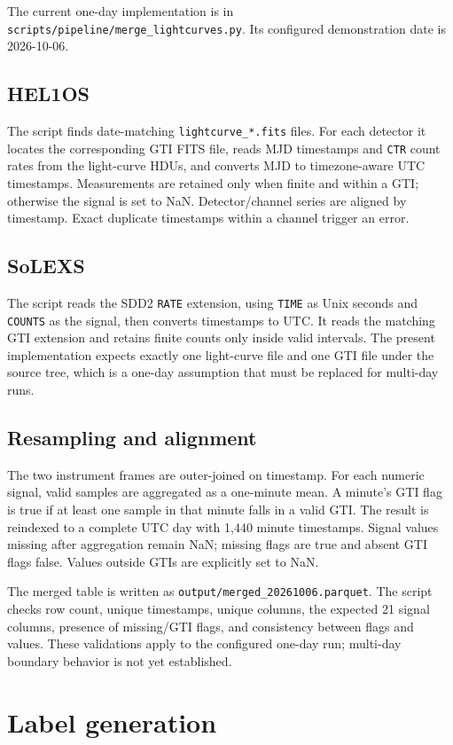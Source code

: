 \documentclass[11pt,a4paper]{article}
\begin{document}
The current one-day implementation is in \texttt{scripts/pipeline/merge\_lightcurves.py}. Its configured demonstration date is 2026-10-06.

\subsection{HEL1OS}
The script finds date-matching \texttt{lightcurve\_*.fits} files. For each detector it locates the corresponding GTI FITS file, reads MJD timestamps and \texttt{CTR} count rates from the light-curve HDUs, and converts MJD to timezone-aware UTC timestamps. Measurements are retained only when finite and within a GTI; otherwise the signal is set to NaN. Detector/channel series are aligned by timestamp. Exact duplicate timestamps within a channel trigger an error.

\subsection{SoLEXS}
The script reads the SDD2 \texttt{RATE} extension, using \texttt{TIME} as Unix seconds and \texttt{COUNTS} as the signal, then converts timestamps to UTC. It reads the matching GTI extension and retains finite counts only inside valid intervals. The present implementation expects exactly one light-curve file and one GTI file under the source tree, which is a one-day assumption that must be replaced for multi-day runs.

\subsection{Resampling and alignment}
The two instrument frames are outer-joined on timestamp. For each numeric signal, valid samples are aggregated as a one-minute mean. A minute's GTI flag is true if at least one sample in that minute falls in a valid GTI. The result is reindexed to a complete UTC day with 1,440 minute timestamps. Signal values missing after aggregation remain NaN; missing flags are true and absent GTI flags false. Values outside GTIs are explicitly set to NaN.

The merged table is written as \texttt{output/merged\_20261006.parquet}. The script checks row count, unique timestamps, unique columns, the expected 21 signal columns, presence of missing/GTI flags, and consistency between flags and values. These validations apply to the configured one-day run; multi-day boundary behavior is not yet established.

\section{Label generation}
\end{document}
